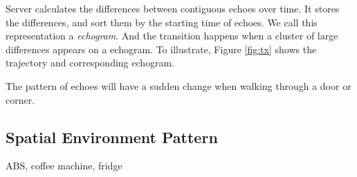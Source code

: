 Server calculates the differences between contiguous echoes over time. It stores the differences,
and sort them by the starting time of echoes. We call this representation a {\em echogram}. And the transition 
happens when a cluster of large
differences appears on a echogram. To illustrate, Figure \ref{fig:tx} shows the trajectory and corresponding 
echogram. 

 


The pattern of 
echoes will have a sudden change when walking through a door or corner.



\subsection{Spatial Environment Pattern}

ABS, coffee machine, fridge 
